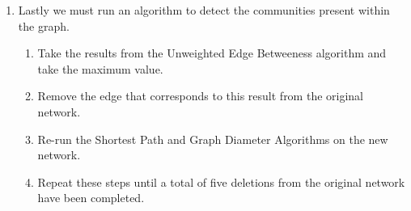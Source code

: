 \documentclass{article}
\begin{document}
\begin{enumerate}
        \item Lastly we must run an algorithm to detect the communities present within the graph.
        \begin{enumerate}
            \item Take the results from the Unweighted Edge Betweeness algorithm and take the maximum value.
            \item Remove the edge that corresponds to this result from the original network.
            \item Re-run the Shortest Path and Graph Diameter Algorithms on the new network.
            \item Repeat these steps until a total of five deletions from the original network have been completed.
        \end{enumerate}
\end{enumerate}
\end{document}
